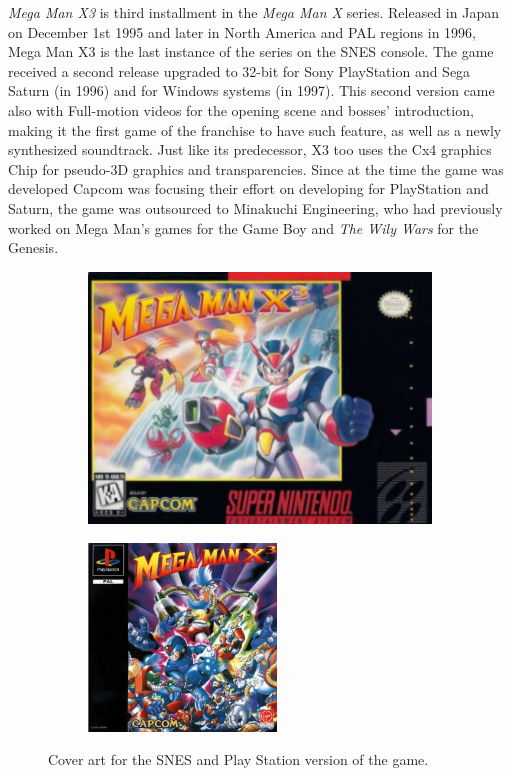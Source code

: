 
\textit{Mega Man X3} is third installment in the \textit{Mega Man X} series. Released in Japan on December 1st 1995 and later in North America and PAL regions in 1996, Mega Man X3 is the last instance of the series on the SNES console. The game received a second release upgraded to 32-bit for Sony PlayStation and Sega Saturn (in 1996) and for Windows systems (in 1997). This second version came also with Full-motion videos for the opening scene and bosses' introduction, making it the first game of the franchise to have such feature, as well as a newly synthesized soundtrack. Just like its predecessor, X3 too uses the Cx4 graphics Chip for pseudo-3D graphics and transparencies. Since at the time the game was developed Capcom was focusing their effort on developing for PlayStation and Saturn, the game was outsourced to Minakuchi Engineering, who had previously worked on Mega Man's games for the Game Boy and \textit{The Wily Wars} for the Genesis.

\begin{figure}[htp]
	\centering
	\begin{subfigure}[c]{0.45\linewidth}
		\centering
		\includegraphics[width=\linewidth]{figures/X3/Mmx3_box.jpg}
	\end{subfigure}
	\begin{subfigure}[c]{0.45\linewidth}
		\centering
		\includegraphics[height=5cm]{figures/X3/X3_ps.jpg}
	\end{subfigure}
	\caption{Cover art for the SNES and Play Station version of the game.}
\end{figure}

